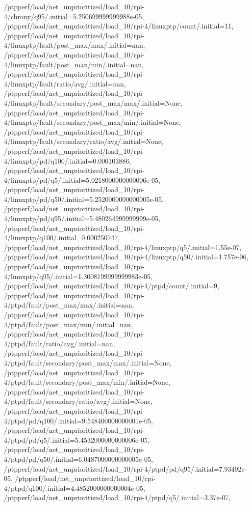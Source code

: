 {    /ptpperf/load/net_unprioritized/load_10/rpi-4/chrony/q95/.initial=5.250699999999988e-05,
    /ptpperf/load/net_unprioritized/load_10/rpi-4/linuxptp/count/.initial=11,
    /ptpperf/load/net_unprioritized/load_10/rpi-4/linuxptp/fault/post_max/max/.initial=nan,
    /ptpperf/load/net_unprioritized/load_10/rpi-4/linuxptp/fault/post_max/min/.initial=nan,
    /ptpperf/load/net_unprioritized/load_10/rpi-4/linuxptp/fault/ratio/avg/.initial=nan,
    /ptpperf/load/net_unprioritized/load_10/rpi-4/linuxptp/fault/secondary/post_max/max/.initial=None,
    /ptpperf/load/net_unprioritized/load_10/rpi-4/linuxptp/fault/secondary/post_max/min/.initial=None,
    /ptpperf/load/net_unprioritized/load_10/rpi-4/linuxptp/fault/secondary/ratio/avg/.initial=None,
    /ptpperf/load/net_unprioritized/load_10/rpi-4/linuxptp/pd/q100/.initial=0.000103886,
    /ptpperf/load/net_unprioritized/load_10/rpi-4/linuxptp/pd/q5/.initial=5.0218000000000006e-05,
    /ptpperf/load/net_unprioritized/load_10/rpi-4/linuxptp/pd/q50/.initial=5.2520000000000005e-05,
    /ptpperf/load/net_unprioritized/load_10/rpi-4/linuxptp/pd/q95/.initial=5.480264999999999e-05,
    /ptpperf/load/net_unprioritized/load_10/rpi-4/linuxptp/q100/.initial=0.000250747,
    /ptpperf/load/net_unprioritized/load_10/rpi-4/linuxptp/q5/.initial=1.55e-07,
    /ptpperf/load/net_unprioritized/load_10/rpi-4/linuxptp/q50/.initial=1.757e-06,
    /ptpperf/load/net_unprioritized/load_10/rpi-4/linuxptp/q95/.initial=1.3008199999999983e-05,
    /ptpperf/load/net_unprioritized/load_10/rpi-4/ptpd/count/.initial=9,
    /ptpperf/load/net_unprioritized/load_10/rpi-4/ptpd/fault/post_max/max/.initial=nan,
    /ptpperf/load/net_unprioritized/load_10/rpi-4/ptpd/fault/post_max/min/.initial=nan,
    /ptpperf/load/net_unprioritized/load_10/rpi-4/ptpd/fault/ratio/avg/.initial=nan,
    /ptpperf/load/net_unprioritized/load_10/rpi-4/ptpd/fault/secondary/post_max/max/.initial=None,
    /ptpperf/load/net_unprioritized/load_10/rpi-4/ptpd/fault/secondary/post_max/min/.initial=None,
    /ptpperf/load/net_unprioritized/load_10/rpi-4/ptpd/fault/secondary/ratio/avg/.initial=None,
    /ptpperf/load/net_unprioritized/load_10/rpi-4/ptpd/pd/q100/.initial=9.548400000000001e-05,
    /ptpperf/load/net_unprioritized/load_10/rpi-4/ptpd/pd/q5/.initial=5.4532000000000006e-05,
    /ptpperf/load/net_unprioritized/load_10/rpi-4/ptpd/pd/q50/.initial=6.0487000000000005e-05,
    /ptpperf/load/net_unprioritized/load_10/rpi-4/ptpd/pd/q95/.initial=7.93492e-05,
    /ptpperf/load/net_unprioritized/load_10/rpi-4/ptpd/q100/.initial=4.4852000000000004e-05,
    /ptpperf/load/net_unprioritized/load_10/rpi-4/ptpd/q5/.initial=3.37e-07,
}
